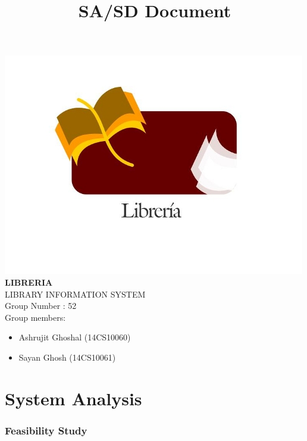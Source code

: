 \documentclass[a4paper]{article}
\title{\textbf{ SA/SD Document}}
\author{}
\date{}
\begin{document}
\maketitle
\begin{center}
\includegraphics[scale=0.6]{images/logoLIS_modified.jpg}
\\
\textbf{LIBRERIA}\\
LIBRARY INFORMATION SYSTEM\\
Group Number : 52\\
Group members: \\
\begin{itemize}
\item \begin{center}Ashrujit Ghoshal (14CS10060)\end{center}
\item \begin{center}Sayan Ghosh (14CS10061)\end{center}
\end{itemize}

\end{center}
\newpage
\hypertarget{toc}{}
\tableofcontents
\newpage
\part{System Analysis}
\section{Feasibility Study}
\end{document}
